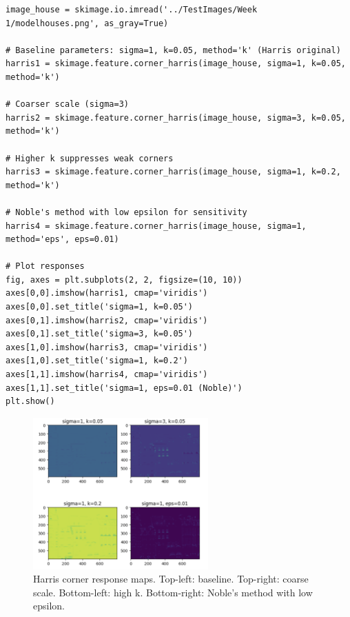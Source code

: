 \documentclass[12pt]{article}
\begin{document}
\begin{lstlisting}
image_house = skimage.io.imread('../TestImages/Week 1/modelhouses.png', as_gray=True)

# Baseline parameters: sigma=1, k=0.05, method='k' (Harris original)
harris1 = skimage.feature.corner_harris(image_house, sigma=1, k=0.05, method='k')

# Coarser scale (sigma=3)
harris2 = skimage.feature.corner_harris(image_house, sigma=3, k=0.05, method='k')

# Higher k suppresses weak corners
harris3 = skimage.feature.corner_harris(image_house, sigma=1, k=0.2, method='k')

# Noble's method with low epsilon for sensitivity
harris4 = skimage.feature.corner_harris(image_house, sigma=1, method='eps', eps=0.01)

# Plot responses
fig, axes = plt.subplots(2, 2, figsize=(10, 10))
axes[0,0].imshow(harris1, cmap='viridis')
axes[0,0].set_title('sigma=1, k=0.05')
axes[0,1].imshow(harris2, cmap='viridis')
axes[0,1].set_title('sigma=3, k=0.05')
axes[1,0].imshow(harris3, cmap='viridis')
axes[1,0].set_title('sigma=1, k=0.2')
axes[1,1].imshow(harris4, cmap='viridis')
axes[1,1].set_title('sigma=1, eps=0.01 (Noble)')
plt.show()
\end{lstlisting}

\begin{figure}[h]
    \centering
    \includegraphics[width=0.6\textwidth]{pics/a5-3.2} 
    \caption{Harris corner response maps. Top-left: baseline. Top-right: coarse scale. Bottom-left: high k. Bottom-right: Noble’s method with low epsilon.}
\end{figure}

\subsection{}
\end{document}
